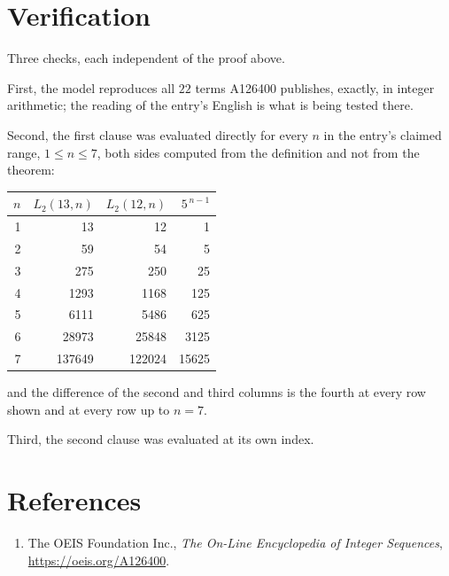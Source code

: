 \documentclass[11pt,a4paper]{article}
\theoremstyle{plain}
\theoremstyle{definition}
\begin{document}
\section{Verification}

Three checks, each independent of the proof above.

First, the model reproduces all $22$ terms A126400 publishes, exactly, in integer
arithmetic; the reading of the entry's English is what is being tested there.

Second, the first clause was evaluated directly for every $n$ in the entry's claimed range,
$1\le n\le7$, both sides computed from the definition and not from the theorem:

\begin{center}
\begin{tabular}{rrrr}
$n$ & $L_{2}(13,n)$ & $L_{2}(12,n)$ & $5^{\,n-1}$ \\ \hline
1 & 13 & 12 & 1 \\
2 & 59 & 54 & 5 \\
3 & 275 & 250 & 25 \\
4 & 1293 & 1168 & 125 \\
5 & 6111 & 5486 & 625 \\
6 & 28973 & 25848 & 3125 \\
7 & 137649 & 122024 & 15625 \\
\end{tabular}
\end{center}

\noindent and the difference of the second and third columns is the fourth at every row shown
and at every row up to $n=7$.

Third, the second clause was evaluated at its own index.

\section*{References}
\begin{enumerate}
\item The OEIS Foundation Inc., \emph{The On-Line Encyclopedia of Integer Sequences},
\url{https://oeis.org/A126400}.
\end{enumerate}
\end{document}
